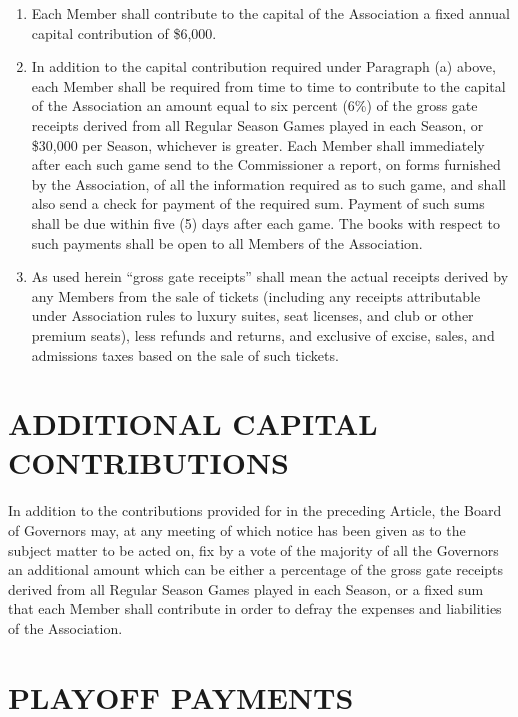 \documentclass[]{book}
\providecommand{\tightlist}{%
  \setlength{\itemsep}{0pt}\setlength{\parskip}{0pt}}
\theoremstyle{definition}
\theoremstyle{definition}
\theoremstyle{definition}
\theoremstyle{remark}
\begin{document}
\begin{enumerate}
\def\labelenumi{(\alph{enumi})}
\tightlist
\item
  Each Member shall contribute to the capital of the Association a fixed
  annual capital contribution of \$6,000.
\item
  In addition to the capital contribution required under Paragraph (a)
  above, each Member shall be required from time to time to contribute
  to the capital of the Association an amount equal to six percent (6\%)
  of the gross gate receipts derived from all Regular Season Games
  played in each Season, or \$30,000 per Season, whichever is greater.
  Each Member shall immediately after each such game send to the
  Commissioner a report, on forms furnished by the Association, of all
  the information required as to such game, and shall also send a check
  for payment of the required sum. Payment of such sums shall be due
  within five (5) days after each game. The books with respect to such
  payments shall be open to all Members of the Association.
\item
  As used herein ``gross gate receipts'' shall mean the actual receipts
  derived by any Members from the sale of tickets (including any
  receipts attributable under Association rules to luxury suites, seat
  licenses, and club or other premium seats), less refunds and returns,
  and exclusive of excise, sales, and admissions taxes based on the sale
  of such tickets.
\end{enumerate}

\section{ADDITIONAL CAPITAL
CONTRIBUTIONS}\label{additional-capital-contributions}

In addition to the contributions provided for in the preceding Article,
the Board of Governors may, at any meeting of which notice has been
given as to the subject matter to be acted on, fix by a vote of the
majority of all the Governors an additional amount which can be either a
percentage of the gross gate receipts derived from all Regular Season
Games played in each Season, or a fixed sum that each Member shall
contribute in order to defray the expenses and liabilities of the
Association.

\section{PLAYOFF PAYMENTS}\label{playoff-payments}
\end{document}

